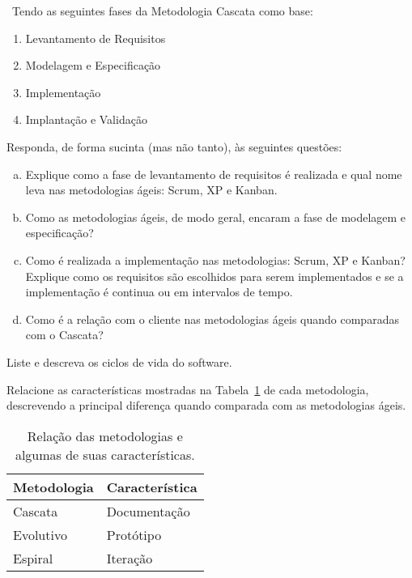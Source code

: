 
~Tendo as seguintes fases da Metodologia Cascata como base:

\begin{enumerate}
\item  Levantamento de Requisitos
\item Modelagem e Especificação
\item Implementação
\item Implantação e Validação
\end{enumerate}

Responda, de forma sucinta (mas não tanto), às seguintes questões:

\begin{enumerate}[a)]

\item [1 ponto(s)] Explique como a fase de levantamento de requisitos é
realizada e qual nome leva nas metodologias ágeis: Scrum, XP e
Kanban.

\item [1 pontos(s)] Como as metodologias ágeis, de modo geral,
encaram a fase de modelagem e especificação?

\item [1,5 ponto(s)] Como é realizada a implementação nas metodologias:
  Scrum, XP e Kanban? Explique como os requisitos são escolhidos para
  serem implementados e se a implementação é continua ou em intervalos
  de tempo.

\item [0,5 ponto(s)] Como é a relação com o cliente nas metodologias
ágeis quando comparadas com o Cascata? 


\end{enumerate}

 Liste e descreva os ciclos de vida do software.

 Relacione as características mostradas na
Tabela~\ref{tab:met} de cada metodologia, descrevendo a principal
diferença quando comparada com as metodologias ágeis.

\begin{table}[ht]
  \centering
\begin{tabular}{l|l}\hline
  \bf Metodologia & \bf Característica \\\hline
  Cascata & Documentação \\
  Evolutivo & Protótipo \\
  Espiral & Iteração \\\hline
\end{tabular}
\caption{Relação das metodologias e algumas de suas características.}
\label{tab:met}
\end{table}

